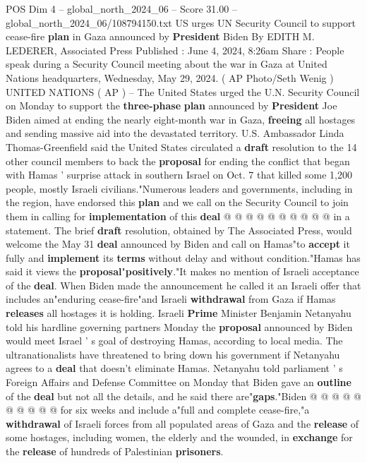 \begin{textsample}{POS Dim 4 – global\_north\_2024\_06 – Score 31.00 – global\_north\_2024\_06/108794150.txt}  \label{ex:f4_pos_141}
US urges UN Security Council to support cease-fire \textbf{plan} in Gaza announced by \textbf{President} Biden By EDITH M.
LEDERER, Associated Press Published : June 4, 2024, 8:26am Share : People speak during a Security Council meeting about the war in Gaza at United Nations headquarters, Wednesday, May 29, 2024. ( AP Photo/Seth Wenig ) UNITED NATIONS ( AP ) -- The United States urged the U.N.
Security Council on Monday to support the \textbf{three-phase} \textbf{plan} announced by \textbf{President} Joe Biden aimed at ending the nearly eight-month war in Gaza, \textbf{freeing} all hostages and sending massive aid into the devastated territory.
U.S.
Ambassador Linda Thomas-Greenfield said the United States circulated a \textbf{draft} resolution to the 14 other council members to back the \textbf{proposal} for ending the conflict that began with Hamas ' surprise attack in southern Israel on Oct. 7 that killed some 1,200 people, mostly Israeli civilians."Numerous leaders and governments, including in the region, have endorsed this \textbf{plan} and we call on the Security Council to join them in calling for \textbf{implementation} of this \textbf{deal} @ @ @ @ @ @ @ @ @ @ in a statement.
The brief \textbf{draft} resolution, obtained by The Associated Press, would welcome the May 31 \textbf{deal} announced by Biden and call on Hamas"to \textbf{accept} it fully and \textbf{implement} its \textbf{terms} without delay and without condition."Hamas has said it views the \textbf{proposal}"\textbf{positively}."It makes no mention of Israeli acceptance of the \textbf{deal}.
When Biden made the announcement he called it an Israeli offer that includes an"enduring cease-fire"and Israeli \textbf{withdrawal} from Gaza if Hamas \textbf{releases} all hostages it is holding.
Israeli \textbf{Prime} Minister Benjamin Netanyahu told his hardline governing partners Monday the \textbf{proposal} announced by Biden would meet Israel ' s goal of destroying Hamas, according to local media.
The ultranationalists have threatened to bring down his government if Netanyahu agrees to a \textbf{deal} that doesn't eliminate Hamas.
Netanyahu told parliament ' s Foreign Affairs and Defense Committee on Monday that Biden gave an \textbf{outline} of the \textbf{deal} but not all the details, and he said there are"\textbf{gaps}."Biden @ @ @ @ @ @ @ @ @ @ for six weeks and include a"full and complete cease-fire,"a \textbf{withdrawal} of Israeli forces from all populated areas of Gaza and the \textbf{release} of some hostages, including women, the elderly and the wounded, in \textbf{exchange} for the \textbf{release} of hundreds of Palestinian \textbf{prisoners}.

\end{textsample}
